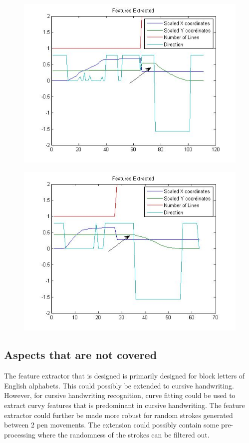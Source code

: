 \begin{figure}[H]
	\centering
	\begin{minipage}{.49\textwidth}
		\centering
		\includegraphics[width=.99\linewidth]{images/deepas/plus}
		\label{fig:plus_vs_T_1}
	\end{minipage}
	\begin{minipage}{.49\textwidth}
		\centering
		\includegraphics[width=.99\linewidth]{images/deepas/T}
		\label{fig:plus_vs_T_2}
	\end{minipage}
\end{figure}
 
\subsection{Aspects that are not covered}
The feature extractor that is designed is primarily designed for block letters of English alphabets. This could possibly be extended to cursive handwriting. However, for cursive handwriting recognition, curve fitting could be used to extract curvy features that is predominant in cursive handwriting.  The feature extractor could further be made more robust for random strokes generated between 2 pen movements. The extension could possibly contain some pre-processing where the randomness of the strokes can be filtered out.